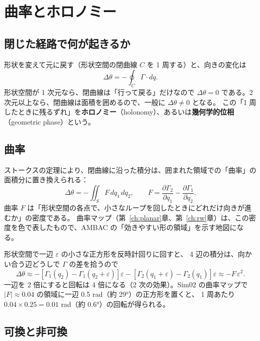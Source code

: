 \section{曲率とホロノミー}

\subsection{閉じた経路で何が起きるか}

形状を変えて元に戻す（形状空間の閉曲線 $C$ を 1 周する）と、向きの変化は
\begin{equation}
\Delta\theta = -\oint_C\Gamma\cdot dq .
\end{equation}
形状空間が 1 次元なら、閉曲線は「行って戻る」だけなので $\Delta\theta=0$ である。2 次元以上なら、閉曲線は面積を囲めるので、一般に $\Delta\theta\neq0$ となる。
この「1 周したときに残るずれ」を\textbf{ホロノミー}（holonomy）、あるいは\textbf{幾何学的位相}（geometric phase）という。

\subsection{曲率}

ストークスの定理により、閉曲線に沿った積分は、囲まれた領域での「曲率」の面積分に置き換えられる：
\begin{equation}
\Delta\theta = -\iint_S F\,dq_1\,dq_2,\qquad F = \frac{\partial\Gamma_2}{\partial q_1}-\frac{\partial\Gamma_1}{\partial q_2}.
\end{equation}
曲率 $F$ は「形状空間の各点で、小さなループを回したときにどれだけ向きが進むか」の密度である。
曲率マップ（第~\ref{ch:planar}章、第~\ref{ch:rw}章）は、この密度を色で表したもので、AMBAC の「効きやすい形の領域」を示す地図になる。

\begin{example}[小さな正方形ループ]
形状空間で一辺 $\varepsilon$ の小さな正方形を反時計回りに回すと、
4 辺の積分は、向かい合う辺どうしで $\Gamma$ の差を拾うので
\[
\Delta\theta \approx -\left[\Gamma_1(q_2)-\Gamma_1(q_2+\varepsilon)\right]\varepsilon - \left[\Gamma_2(q_1+\varepsilon)-\Gamma_2(q_1)\right]\varepsilon
\approx -F\,\varepsilon^2 .
\]
一辺を 2 倍にすると回転は 4 倍になる（2 次の効果）。Sim02 の曲率マップで $|F|\approx0.04$ の領域に一辺 0.5 rad（約 29°）の正方形を置くと、
1 周あたり $0.04\times0.25 = 0.01$ rad（約 0.6°）の回転が得られる。
\end{example}

\subsection{可換と非可換}

